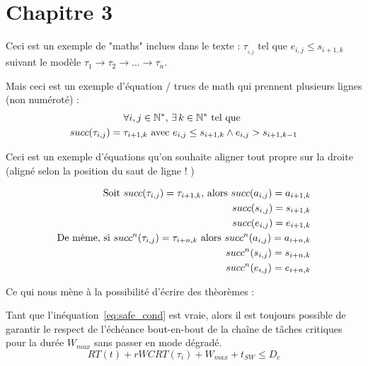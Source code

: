 \documentclass[french, a4paper, 11pt, twoside, pdftex]{StyleThese}
\begin{document}
\setcounter{chapter}{3} %
\dominitoc
\faketableofcontents
\fi

\chapter{Chapitre 3} \label{chap:3_PrincipeArchi}
\minitoc



		Ceci est un exemple de "maths" inclues dans le texte :  $\tau__{i,j}$ tel que $ e_{i,j} \leq s_{i+1, k}$  suivant le modèle $\tau_{1} \rightarrow \tau_2 \rightarrow \ldots \rightarrow \tau_n$. 

	   Mais ceci est un exemple d'équation / trucs de math qui prennent plusieurs lignes (non numéroté) :
		\begin{multline*}
		\forall i,j \in \mathbb{N}^*, \, \exists \, k \in  \mathbb{N}^*  \textrm{ tel que }  \\
		 succ(\tau_{i,j}) = \tau_{i+1,k} \textup{ avec } e_{i,j} \leq s_{i+1,k} \wedge e_{i,j} > s_{i+1,k-1}
		\end{multline*}

        Ceci est un exemple d'équations qu'on souhaite aligner tout propre sur la droite (aligné selon la position du saut de ligne ! )

		\begin{align*}
		\textup{Soit } succ(\tau_{i,j}) = \tau_{i+1,k} \textup{, alors }
			succ(a_{i,j}) = a_{i+1,k} 	\\
			succ(s_{i,j}) = s_{i+1,k}	\\
			succ(e_{i,j}) = e_{i+1,k}	\\
		\textup{De même, si } succ^n(\tau_{i,j}) = \tau_{i+n,k} \textup{ alors }
			succ^n(a_{i,j}) = a_{i+n,k}		\\
			succ^n(s_{i,j}) = s_{i+n,k}		\\
			succ^n(e_{i,j}) = e_{i+n,k}
		\end{align*}

  		 Ce qui nous mène à la possibilité d'écrire des thèorèmes :

	\begin{theorem}
		Tant que l'inéquation~\ref{eq:safe_cond} est vraie, alors il est toujours possible de garantir le respect de l'échéance bout-en-bout de la chaîne de tâches critiques pour la durée $W_{max}$ sans passer en mode dégradé.
		\begin{equation} \label{eq:safe_cond}
			RT(t) + rWCRT(\tau_i) + W_{max} + t_{SW} \leq D_c
		\end{equation}
	\end{theorem}
\end{document}
